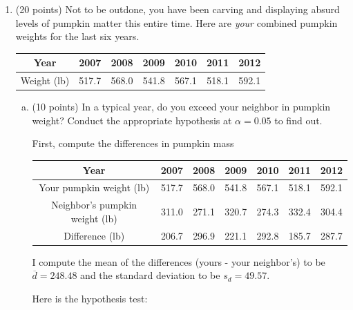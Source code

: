 \documentclass{article}\usepackage{graphicx, color}
\providecommand{\ov}[1]{\overline{#1}}
\numberwithin{equation}{section}
\begin{document}
\begin{flushleft}
\begin{enumerate}[1. ]
\begin{enumerate}[a. ]
{With 95\% confidence, the true mean annual combined pumpkin weight exceeds 280 lb. That's TOO MUCH PUMPKIN MATTER for individual use. 
}

\end{enumerate}


\item (20 points) Not to be outdone, you have been carving and displaying absurd levels of pumpkin matter this entire time. Here are \emph{your} combined pumpkin weights for the last six years.

\begin{center}
\begin{tabular}{c|cccccc}
Year & 2007 & 2008 & 2009 & 2010 & 2011 & 2012 \\ \hline
Weight (lb) & 517.7 & 568.0 & 541.8 & 567.1 & 518.1 & 592.1   \\ 
\end{tabular}
\end{center}

\begin{enumerate}[a. ]
\item (10 points) In a typical year, do you exceed your neighbor in pumpkin weight? Conduct the appropriate hypothesis at $\alpha = 0.05$ to find out.

{\color{red}
First, compute the differences in pumpkin mass


\begin{center}
\begin{tabular}{c|cccccc}
Year & 2007 & 2008 & 2009 & 2010 & 2011 & 2012 \\ \hline
Your pumpkin weight (lb) & 517.7 & 568.0 & 541.8 & 567.1 & 518.1 & 592.1    \\ 
Neighbor's pumpkin weight (lb) & 311.0 & 271.1 & 320.7 & 274.3 & 332.4 & 304.4   \\ 
Difference (lb) &206.7 & 296.9 & 221.1 & 292.8 & 185.7& 287.7
\end{tabular}
\end{center}

I compute the mean of the differences (yours - your neighbor's) to be $\ov{d} = 248.48$ and the standard deviation to be $s_d = 49.57$.


Here is the hypothesis test:

}
\end{enumerate}
\end{enumerate}
\end{flushleft}
\end{document}
